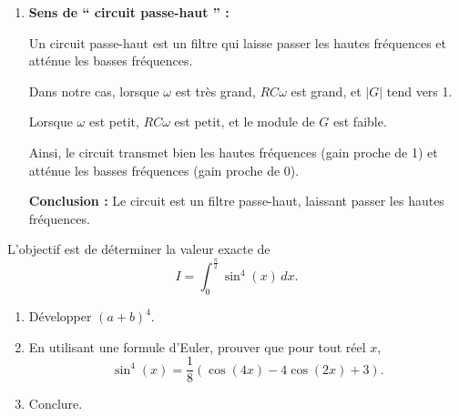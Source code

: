 \documentclass[a4paper,12pt]{article}
\begin{document}
\begin{solutionbox}
\begin{enumerate}
    Alors :

    \[
    G = \dfrac{i \times 3840}{1 + i \times 3840} = \dfrac{i \times 3840}{1 + i \times 3840}
    \]

    Calculons le module de \( G \) :

    Le module de \( G \) est :

    \[
    |G| = \dfrac{|i \times 3840|}{\sqrt{1^2 + (3840)^2}} = \dfrac{3840}{\sqrt{1 + 3840^2}}
    \]

    Calculons \( \sqrt{1 + 3840^2} \) :

    \[
    \sqrt{1 + 3840^2} = \sqrt{1 + 14,745,600} = \sqrt{14,745,601} \approx 3840.00013
    \]

    Donc :

    \[
    |G| = \dfrac{3840}{3840.00013} \approx 0.99999997 \approx 1
    \]

    \textbf{Conclusion :} Le module de \( G \) est très proche de 1.

    \item \textbf{Sens de `` circuit passe-haut '' :}

    Un circuit passe-haut est un filtre qui laisse passer les hautes fréquences et atténue les basses fréquences.

    Dans notre cas, lorsque \( \omega \) est très grand, \( R C \omega \) est grand, et \( |G| \) tend vers 1.

    Lorsque \( \omega \) est petit, \( R C \omega \) est petit, et le module de \( G \) est faible.

    Ainsi, le circuit transmet bien les hautes fréquences (gain proche de 1) et atténue les basses fréquences (gain proche de 0).

    \textbf{Conclusion :} Le circuit est un filtre passe-haut, laissant passer les hautes fréquences.

\end{enumerate}
\end{solutionbox}

\begin{tcolorbox}[title={Exercice 23}]
L'objectif est de déterminer la valeur exacte de
\[
I = \int_0^{\frac{\pi}{2}} \sin^4(x) \, dx.
\]

\begin{enumerate}
    \item Développer \( (a + b)^4 \).
    \item En utilisant une formule d'Euler, prouver que pour tout réel \( x \),
       \[
       \sin^4(x) = \dfrac{1}{8} \left( \cos(4x) - 4\cos(2x) + 3 \right).
       \]
    \item Conclure.
\end{enumerate}
\end{tcolorbox}
\end{document}
